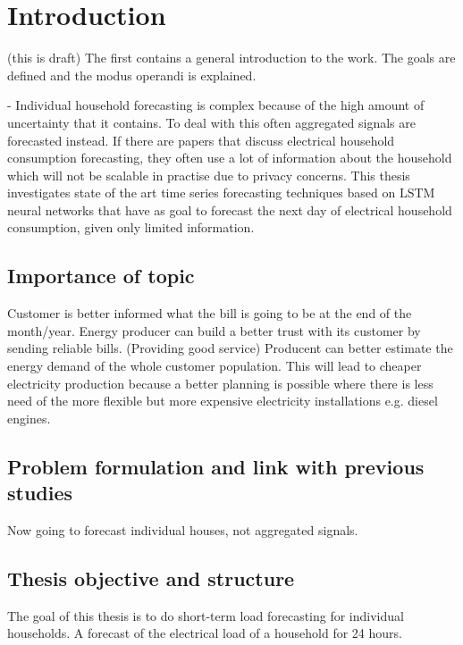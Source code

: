 \chapter{Introduction}
\label{cha:intro}
(this is draft)
The first contains a general introduction to the work. The goals are
defined and the modus operandi is explained.

- Individual household forecasting is complex because of the high amount of uncertainty that it contains. To deal with this often aggregated signals are forecasted instead. If there are papers that discuss electrical household consumption forecasting, they often use a lot of information about the household which will not be scalable in practise due to privacy concerns. This thesis investigates state of the art time series forecasting techniques based on LSTM neural networks that have as goal to forecast the next day of electrical household consumption, given only limited information.

\section{Importance of topic}
Customer is better informed what the bill is going to be at the end of the month/year.
Energy producer can build a better trust with its customer by sending reliable bills. (Providing good service)
Producent can better estimate the energy demand of the whole customer population. This will lead to cheaper electricity production because a better planning is possible where there is less need of the more 
flexible but more expensive electricity installations e.g. diesel engines.

\section{Problem formulation and link with previous studies}
Now going to forecast individual houses, not aggregated signals. 


\section{Thesis objective and structure}
The goal of this thesis is to do short-term load forecasting for individual households. A forecast of the electrical load of a household for 24 hours. 

